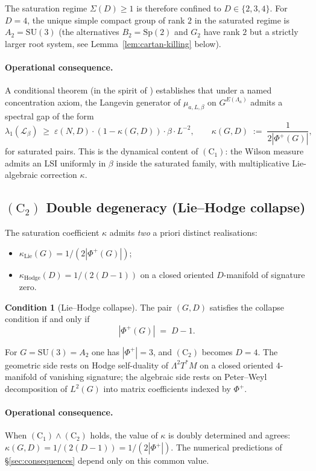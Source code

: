 \documentclass[11pt,reqno]{amsart}
\theoremstyle{plain}
\theoremstyle{definition}
\newtheorem{condition}[theorem]{Condition}
\theoremstyle{remark}
\newcommand{\calL}{\mathcal{L}}
\newcommand{\Lat}{\Lambda}
\newcommand{\SU}{\mathrm{SU}}
\newcommand{\Cone}{(\mathrm{C}_1)}
\newcommand{\Ctwo}{(\mathrm{C}_2)}
\begin{document}
The saturation regime $\Sigma(D) \ge 1$ is therefore confined to $D \in \{2, 3, 4\}$. For $D = 4$, the unique simple compact group of rank $2$ in the saturated regime is $A_2 = \SU(3)$ (the alternatives $B_2 = \mathrm{Sp}(2)$ and $G_2$ have rank $2$ but a strictly larger root system, see Lemma~\ref{lem:cartan-killing} below).

\paragraph{Operational consequence.}
A conditional theorem (in the spirit of \cite{PaperLMP_E}) establishes that under a named concentration axiom, the Langevin generator of $\mu_{a, L, \beta}$ on $G^{E(\Lat_a)}$ admits a spectral gap of the form
\[
  \lambda_1(\calL_\beta) \;\ge\; \varepsilon(N, D) \cdot (1 - \kappa(G, D)) \cdot \beta \cdot L^{-2},
\qquad
  \kappa(G, D) \;:=\; \frac{1}{2 |\Phi^+(G)|},
\]
for saturated pairs. This is the dynamical content of $\Cone$: the Wilson measure admits an LSI uniformly in $\beta$ inside the saturated family, with multiplicative Lie-algebraic correction $\kappa$.

\subsection{$\Ctwo$ Double degeneracy (Lie--Hodge collapse)}\label{ssec:C2}

The saturation coefficient $\kappa$ admits \emph{two} a priori distinct realisations:
\begin{itemize}
  \item[(alg.)] $\kappa_{\mathrm{Lie}}(G) = 1/(2 |\Phi^+(G)|)$;
  \item[(geo.)] $\kappa_{\mathrm{Hodge}}(D) = 1/(2(D-1))$ on a closed oriented $D$-manifold of signature zero.
\end{itemize}

\begin{condition}[Lie--Hodge collapse]\label{cond:C2}
The pair $(G, D)$ satisfies the collapse condition if and only if
\[
  |\Phi^+(G)| \;=\; D - 1.
\]
\end{condition}

For $G = \SU(3) = A_2$ one has $|\Phi^+| = 3$, and $\Ctwo$ becomes $D = 4$. The geometric side rests on Hodge self-duality of $\Lambda^2 T^*M$ on a closed oriented $4$-manifold of vanishing signature; the algebraic side rests on Peter--Weyl decomposition of $L^2(G)$ into matrix coefficients indexed by $\Phi^+$.

\paragraph{Operational consequence.}
When $\Cone \wedge \Ctwo$ holds, the value of $\kappa$ is doubly determined and agrees: $\kappa(G, D) = 1/(2(D-1)) = 1/(2|\Phi^+|)$. The numerical predictions of \S\ref{sec:consequences} depend only on this common value.
\end{document}
